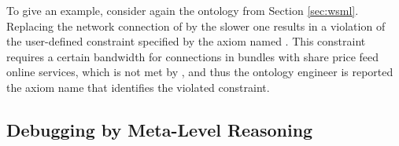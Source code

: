 To give an example, consider again the ontology from Section
\ref{sec:wsml}. Replacing the network connection
 of  by the slower
 one results in a violation of the
user-defined constraint specified by the axiom named
. This constraint
requires a certain bandwidth for connections in bundles with share
price feed online services, which is not met by
, and thus the ontology engineer is reported
the axiom name that identifies the violated constraint.


\subsection{Debugging by Meta-Level Reasoning}
